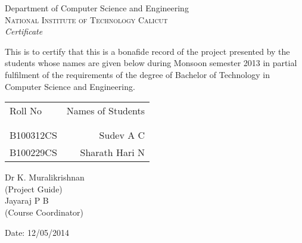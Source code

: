 \newpage
\thispagestyle{empty}

\begin{center}

\huge{Department of Computer Science and Engineering}\\[0.5cm]
\normalsize
\textsc{National Institute of Technology Calicut}\\[2.0cm]

\emph{\LARGE Certificate}\\[2.5cm]
\end{center}
\normalsize This is to certify that this is a bonafide record of the project presented by the students whose names are given below during Monsoon semester 2013 in partial fulfilment of the requirements of the degree of Bachelor of Technology in Computer Science and Engineering.\\[1.0cm]

\begin{table}[h]
\centering
\begin{tabular}{lr}
Roll No & Names of Students \\ \\ \hline
\\
B100312CS & Sudev A C \\ 
B100229CS & Sharath Hari N \\
\end{tabular}
\end{table}

\vfill


\begin{flushright}
Dr K. Muralikrishnan\\
(Project Guide)\\[1.5cm]
Jayaraj P B\\
(Course Coordinator)\\
\end{flushright}

\begin{flushleft}
Date: 12/05/2014
\end{flushleft}
